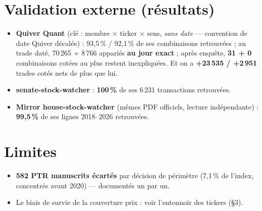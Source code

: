 \documentclass[10pt,a4paper,twocolumn]{article}
\begin{document}
\section{Validation externe (résultats)}
\begin{itemize}
  \item \textbf{Quiver Quant} (clé : membre $\times$ ticker $\times$ sens, \emph{sans date} —
        convention de date Quiver décalée) : 93{,}5\,\% / 92{,}1\,\% de ses combinaisons retrouvées ; au trade daté,
        70\,265 + 8\,766 appariés \textbf{au jour exact} ; après enquête, \textbf{31 + 0} combinaisons
        cotées au plus restent inexpliquées. Et on a \textbf{+23\,535 / +2\,951} trades cotés nets
        de plus que lui.
  \item \textbf{senate-stock-watcher} : \textbf{100\,\%} de ses 6\,231 transactions retrouvées.
  \item \textbf{Mirror house-stock-watcher} (mêmes PDF officiels, lecture indépendante) :
        \textbf{99{,}5\,\%} de ses lignes 2018--2026 retrouvées.
\end{itemize}

\section{Limites}
\begin{itemize}
  \item \textbf{582 PTR manuscrits écartés} par décision de périmètre (7{,}1\,\% de l'index,
        concentrés avant 2020) — documentés un par un.
  \item Le biais de survie de la couverture prix : voir l'entonnoir des tickers (\S3).
\end{itemize}
\end{document}
